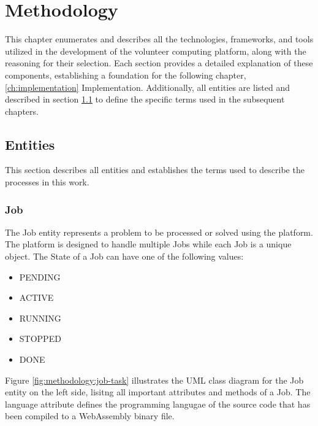 \chapter{Methodology}
\label{ch:methodology}
This chapter enumerates and describes all the technologies, frameworks, and tools utilized in the development of the volunteer computing platform, along with the reasoning for their selection. Each section provides a detailed explanation of these components, establishing a foundation for the following chapter, \ref{ch:implementation} Implementation. Additionally, all entities are listed and described in section \ref{sec:methodology:entities} to define the specific terms used in the subsequent chapters.

\section{Entities}
\label{sec:methodology:entities}
This section describes all entities and establishes the terms used to describe the processes in this work.

\subsection{Job}
\label{subsec:methodology:entities:job}
The Job entity represents a problem to be processed or solved using the platform. The platform is designed to handle multiple Jobs while each Job is a unique object. The State of a Job can have one of the following values:

\begin{itemize}
\item PENDING
\item ACTIVE
\item RUNNING
\item STOPPED
\item DONE
\end{itemize}

Figure \ref{fig:methodology:job-task} illustrates the \ac{UML} class diagram for the Job entity on the left side, lisitng all important attributes and methods of a Job. The language attribute defines the programming langugae of the source code that has been compiled to a WebAssembly binary file.

